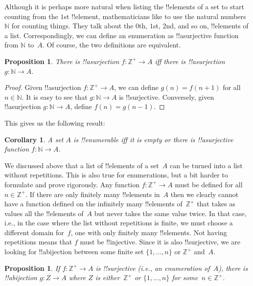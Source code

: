 \documentclass[10pt,a4paper]{article}
\theoremstyle{plain}
\newtheorem{prop}[thm]{Proposition}
\newtheorem{cor}[thm]{Corollary}
\theoremstyle{definition}
\theoremstyle{remark}
\newcommand*{\ollabel}[1]{\label{#1}}
\providecommand{\Nat}{\ensuremath{\mathbb{N}}}
\providecommand{\PosInt}{\mathbb{Z}^{+}}
\begin{document}
Although it is perhaps more natural when listing the !!{element}s of a
set to start counting from the $1$st !!{element}, mathematicians like
to use the natural numbers~$\Nat$ for counting things. They
talk about the $0$th, $1$st, $2$nd, and so on, !!{element}s of a list.
Correspondingly, we can define an enumeration as !!a{surjective}
function from $\Nat$ to~$A$. Of course, the two definitions are
equivalent.

\begin{prop}\ollabel{prop:enum-shift}
  There is !!a{surjection} $f\colon \PosInt \to A$ iff there is
  !!a{surjection} $g\colon \Nat \to A$.
\end{prop}

\begin{proof}
  Given !!a{surjection} $f\colon \PosInt \to A$, we can define $g(n) =
  f(n+1)$ for all $n \in \Nat$. It is easy to see that $g\colon \Nat
  \to A$ is !!{surjective}. Conversely, given !!a{surjection} $g\colon
  \Nat \to A$, define $f(n) = g(n-1)$.
\end{proof}

This gives us the following result:

\begin{cor}\ollabel{cor:enum-nat}
A set $A$ is !!{enumerable} iff it is empty or there is
!!a{surjective} function $f\colon \Nat \to A$.
\end{cor}

We discussed above that a list of !!{element}s of a set~$A$ can be
turned into a list without repetitions. This is also true for
enumerations, but a bit harder to formulate and prove rigorously. Any
function $f\colon \PosInt \to A$ must be defined for all $n \in
\PosInt$. If there are only finitely many !!{element}s in~$A$ then we
clearly cannot have a function defined on the infinitely many
!!{element}s of~$\PosInt$ that takes as values all the !!{element}s
of~$A$ but never takes the same value twice. In that case, i.e., in
the case where the list without repetitions is finite, we must choose
a different domain for~$f$, one with only finitely many !!{element}s.
Not having repetitions means that $f$ must be !!{injective}. Since it
is also !!{surjective}, we are looking for !!a{bijection} between some
finite set $\{1, \dots, n\}$ or $\PosInt$ and~$A$.

\begin{prop}\ollabel{prop:enum-bij}
If $f\colon \PosInt \to A$ is !!{surjective} (i.e., an enumeration
of~$A$), there is !!a{bijection} $g\colon Z \to A$ where $Z$ is
either~$\PosInt$ or $\{1, \dots, n\}$ for some~$n \in \PosInt$.
\end{prop}
\end{document}
